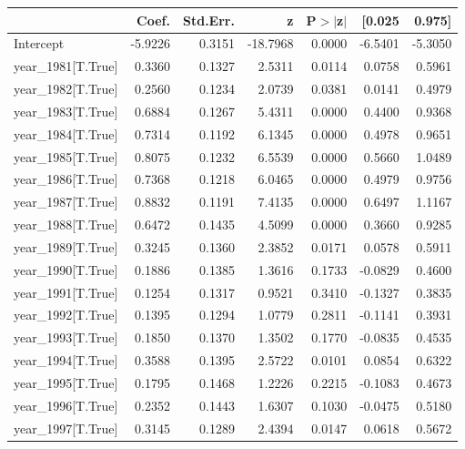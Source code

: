 \begin{table}
\begin{center}
\begin{tabular}{lrrrrrr}
\hline
                         &   Coef. & Std.Err. &        z & P$> |$z$|$ &  [0.025 &  0.975]  \\
\hline
Intercept                & -5.9226 &   0.3151 & -18.7968 &      0.0000 & -6.5401 & -5.3050  \\
year\_1981[T.True]       &  0.3360 &   0.1327 &   2.5311 &      0.0114 &  0.0758 &  0.5961  \\
year\_1982[T.True]       &  0.2560 &   0.1234 &   2.0739 &      0.0381 &  0.0141 &  0.4979  \\
year\_1983[T.True]       &  0.6884 &   0.1267 &   5.4311 &      0.0000 &  0.4400 &  0.9368  \\
year\_1984[T.True]       &  0.7314 &   0.1192 &   6.1345 &      0.0000 &  0.4978 &  0.9651  \\
year\_1985[T.True]       &  0.8075 &   0.1232 &   6.5539 &      0.0000 &  0.5660 &  1.0489  \\
year\_1986[T.True]       &  0.7368 &   0.1218 &   6.0465 &      0.0000 &  0.4979 &  0.9756  \\
year\_1987[T.True]       &  0.8832 &   0.1191 &   7.4135 &      0.0000 &  0.6497 &  1.1167  \\
year\_1988[T.True]       &  0.6472 &   0.1435 &   4.5099 &      0.0000 &  0.3660 &  0.9285  \\
year\_1989[T.True]       &  0.3245 &   0.1360 &   2.3852 &      0.0171 &  0.0578 &  0.5911  \\
year\_1990[T.True]       &  0.1886 &   0.1385 &   1.3616 &      0.1733 & -0.0829 &  0.4600  \\
year\_1991[T.True]       &  0.1254 &   0.1317 &   0.9521 &      0.3410 & -0.1327 &  0.3835  \\
year\_1992[T.True]       &  0.1395 &   0.1294 &   1.0779 &      0.2811 & -0.1141 &  0.3931  \\
year\_1993[T.True]       &  0.1850 &   0.1370 &   1.3502 &      0.1770 & -0.0835 &  0.4535  \\
year\_1994[T.True]       &  0.3588 &   0.1395 &   2.5722 &      0.0101 &  0.0854 &  0.6322  \\
year\_1995[T.True]       &  0.1795 &   0.1468 &   1.2226 &      0.2215 & -0.1083 &  0.4673  \\
year\_1996[T.True]       &  0.2352 &   0.1443 &   1.6307 &      0.1030 & -0.0475 &  0.5180  \\
year\_1997[T.True]       &  0.3145 &   0.1289 &   2.4394 &      0.0147 &  0.0618 &  0.5672  \\

\end{tabular}
\end{center}
\end{table}
